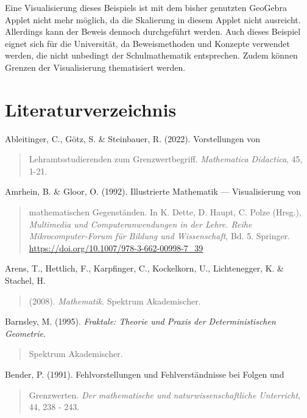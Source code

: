 \documentclass[a4paper, 12pt]{book}
\begin{document}
Eine Visualisierung dieses Beispiels ist mit dem bisher genutzten
GeoGebra Applet nicht mehr möglich, da die Skalierung in diesem Applet
nicht ausreicht. Allerdings kann der Beweis dennoch durchgeführt werden.
Auch dieses Beispiel eignet sich für die Universität, da Beweismethoden
und Konzepte verwendet werden, die nicht unbedingt der Schulmathematik
entsprechen. Zudem können Grenzen der Visualisierung thematisiert
werden.



\hypertarget{literaturverzeichnis}{%
\section{Literaturverzeichnis}\label{literaturverzeichnis}}

Ableitinger, C., Götz, S. \& Steinbauer, R. (2022). Vorstellungen von

\begin{quote}
Lehramtsstudierenden zum Grenzwertbegriff. \emph{Mathematica Didactica},
45, 1-21.
\end{quote}

Amrhein, B. \& Gloor, O. (1992). Illustrierte Mathematik ---
Visualisierung von

\begin{quote}
mathematischen Gegenständen. In K. Dette, D. Haupt, C. Polze (Hrsg.),
\emph{Multimedia und Computeranwendungen in der Lehre. Reihe
Mikrocomputer-Forum für Bildung und Wissenschaft}, Bd. 5. Springer.
\url{https://doi.org/10.1007/978-3-662-00998-7_39}
\end{quote}

Arens, T., Hettlich, F., Karpfinger, C., Kockelkorn, U., Lichtenegger,
K. \& Stachel, H.

\begin{quote}
(2008). \emph{Mathematik}. Spektrum Akademischer.
\end{quote}

Barnsley, M. (1995). \emph{Fraktale: Theorie und Praxis der
Deterministischen Geometrie}.

\begin{quote}
Spektrum Akademischer.
\end{quote}

Bender, P. (1991). Fehlvorstellungen und Fehlverständnisse bei Folgen
und

\begin{quote}
Grenzwerten. \emph{Der mathematische und naturwissenschaftliche
Unterricht}, 44, 238 - 243.
\end{quote}
\end{document}

